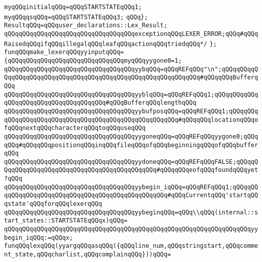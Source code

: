 \verb|myqQQqinitialqQQq=qQQqSTARTSTATEqQQq1;|\newline
\verb|myqQQqqsqQQq=qQQqSTARTSTATEqQQq3;|\newline
\newline
\verb|qQQq};|\newline
\verb|ResultqQQq=qQQquser_declarations::Lex_Result;|\newline
\verb|qQQqqQQqqQQqqQQqqQQqqQQqqQQqqQQqqQQqexceptionqQQqLEXER_ERROR;qQQq#qQQqRaisedqQQqifqQQqillegalqQQqleafqQQqactionqQQqtriedqQQq*/|\newline
\verb|};|\newline
\newline
\verb|funqQQqmake_lexerqQQqyyinputqQQq=|\newline
\verb|{qQQqqQQqqQQqqQQqqQQqqQQqqQQqqQQqmyqQQqyygone0=1;|\newline
\verb|qQQqqQQqqQQqqQQqqQQqqQQqqQQqqQQqqQQqyybqQQq=qQQqREFqQQq"\n";qQQqqQQqqQQqqQQqqQQqqQQqqQQqqQQqqQQqqQQqqQQqqQQqqQQqqQQqqQQqqQQq#qQQqqQQqBufferqQQq|\newline
\verb|qQQqqQQqqQQqqQQqqQQqqQQqqQQqqQQqqQQqyyblqQQq=qQQqREFqQQq1;qQQqqQQqqQQqqQQqqQQqqQQqqQQqqQQqqQQqqQQq#qQQqBufferqQQqlengthqQQq|\newline
\verb|qQQqqQQqqQQqqQQqqQQqqQQqqQQqqQQqqQQqyybufposqQQq=qQQqREFqQQq1;qQQqqQQqqQQqqQQqqQQqqQQqqQQqqQQqqQQqqQQqqQQqqQQqqQQqqQQq#qQQqqQQqlocationqQQqofqQQqnextqQQqcharacterqQQqtoqQQquseqQQq|\newline
\verb|qQQqqQQqqQQqqQQqqQQqqQQqqQQqqQQqqQQqyygoneqQQq=qQQqREFqQQqyygone0;qQQqqQQq#qQQqqQQqpositionqQQqinqQQqfileqQQqofqQQqbeginningqQQqofqQQqbufferqQQq|\newline
\verb|qQQqqQQqqQQqqQQqqQQqqQQqqQQqqQQqqQQqyydoneqQQq=qQQqREFqQQqFALSE;qQQqqQQqqQQqqQQqqQQqqQQqqQQqqQQqqQQqqQQqqQQqqQQq#qQQqqQQqeofqQQqfoundqQQqyet?qQQq|\newline
\verb|qQQqqQQqqQQqqQQqqQQqqQQqqQQqqQQqqQQqyybegin_iqQQq=qQQqREFqQQq1;qQQqqQQqqQQqqQQqqQQqqQQqqQQqqQQqqQQqqQQqqQQqqQQqqQQq#qQQqCurrentqQQq'startqQQqstate'qQQqforqQQqlexerqQQq|\newline
\newline
\verb|qQQqqQQqqQQqqQQqqQQqqQQqqQQqqQQqqQQqyybeginqQQq=qQQq\\qQQq(internal::start_states::STARTSTATEqQQqx)qQQq=|\newline
\verb|qQQqqQQqqQQqqQQqqQQqqQQqqQQqqQQqqQQqqQQqqQQqqQQqqQQqqQQqqQQqqQQqqQQqyybegin_iqQQq:=qQQqx;|\newline
\newline
\verb|funqQQqlexqQQq(yyargqQQqasqQQq({qQQqline_num,qQQqstringstart,qQQqcomment_state,qQQqcharlist,qQQqcomplainqQQq}))qQQq=|\newline
